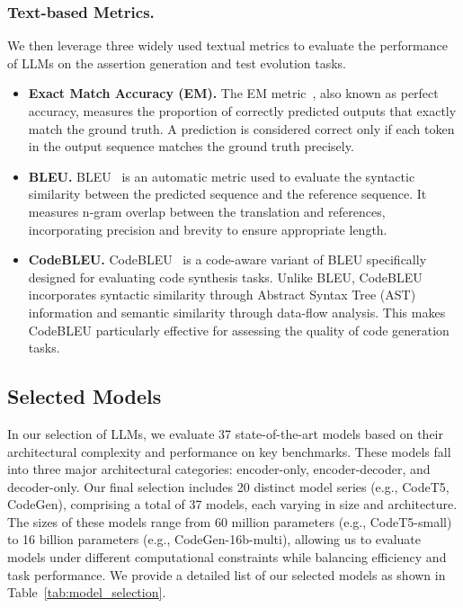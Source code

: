 \subsubsection{Text-based Metrics.}

We then leverage three widely used textual metrics to evaluate the performance of LLMs on the assertion generation and test evolution tasks.


\begin{itemize}[leftmargin=1em]
    \item \textbf{Exact Match Accuracy (EM).} The EM metric~\cite{hou_large_2023}, also known as perfect accuracy, measures the proportion of correctly predicted outputs that exactly match the ground truth. A prediction is considered correct only if each token in the output sequence matches the ground truth precisely.
    
    \item \textbf{BLEU.} BLEU~\cite{papineni_bleu_2002} is an automatic metric used to evaluate the syntactic similarity between the predicted sequence and the reference sequence. It measures n-gram overlap between the translation and references, incorporating precision and brevity to ensure appropriate length.
    
    \item \textbf{CodeBLEU.} CodeBLEU~\cite{ren_codebleu_2020} is a code-aware variant of BLEU specifically designed for evaluating code synthesis tasks. Unlike BLEU, CodeBLEU incorporates syntactic similarity through Abstract Syntax Tree (AST) information and semantic similarity through data-flow analysis. This makes CodeBLEU particularly effective for assessing the quality of code generation tasks.

\end{itemize}

\subsection{Selected Models}
\label{sec:selected_models}

In our selection of LLMs, we evaluate 37 state-of-the-art models based on their architectural complexity and performance on key benchmarks. 
These models fall into three major architectural categories: encoder-only, encoder-decoder, and decoder-only. 
Our final selection includes 20 distinct model series (e.g., CodeT5, CodeGen), comprising a total of 37 models, each varying in size and architecture. 
The sizes of these models range from 60 million parameters (e.g., CodeT5-small) to 16 billion parameters (e.g., CodeGen-16b-multi), allowing us to evaluate models under different computational constraints while balancing efficiency and task performance.
We provide a detailed list of our selected models as shown in Table~\ref{tab:model_selection}.


